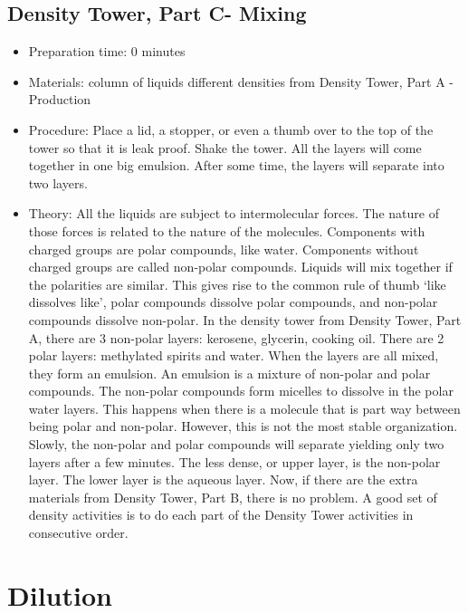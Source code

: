\subsection{Density Tower, Part C- Mixing}
\begin{itemize}
\item{Preparation time: 0 minutes}
\item{Materials: column of liquids different densities from Density Tower, Part A - Production}
\item{Procedure: Place a lid, a stopper, or even a thumb over to the top of the tower so that it is leak proof. Shake the tower. All the layers will come together in one big emulsion. After some time, the layers will separate into two layers.}
\item{Theory: All the liquids are subject to intermolecular forces. The nature of those forces is related to the nature of the molecules. Components with charged groups are polar compounds, like water. Components without charged groups are called non-polar compounds. Liquids will mix together if the polarities are similar. This gives rise to the common rule of thumb ‘like dissolves like’, polar compounds dissolve polar compounds, and non-polar compounds dissolve non-polar. In the density tower from Density Tower, Part A, there are 3 non-polar layers: kerosene, glycerin, cooking oil. There are 2 polar layers: methylated spirits and water. When the layers are all mixed, they form an emulsion. An emulsion is a mixture of non-polar and polar compounds. The non-polar compounds form micelles to dissolve in the polar water layers. This happens when there is a molecule that is part way between being polar and non-polar. However, this is not the most stable organization. Slowly, the non-polar and polar compounds will separate yielding only two layers after a few minutes. The less dense, or upper layer, is the non-polar layer. The lower layer is the aqueous layer. Now, if there are the extra materials from Density Tower, Part B, there is no problem. A good set of density activities is to do each part of the Density Tower activities in consecutive order.}
\end{itemize}

\section{Dilution}


